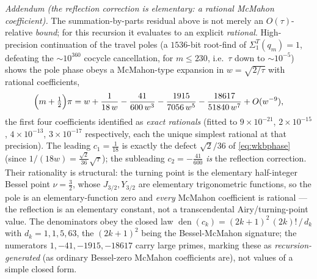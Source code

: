 \smallskip
\noindent\emph{Addendum \textup(the reflection correction is elementary: a rational McMahon coefficient\textup).}
The summation-by-parts residual above is not merely an $O(\tau)$-relative \emph{bound}; for this recursion it
evaluates to an explicit \emph{rational}. High-precision continuation of the travel poles (a $1536$-bit
root-find of $\Sigma_1^T(q_m)=1$, defeating the $\sim\!10^{360}$ cocycle cancellation, for $m\le230$, i.e.\
$\tau$ down to $\sim\!10^{-5}$) shows the pole phase obeys a McMahon-type expansion in $w=\sqrt{2/\tau}$ with
rational coefficients,
\begin{equation}\label{eq:mcmahon}
  \Bigl(m+\tfrac12\Bigr)\pi=w+\frac{1}{18\,w}-\frac{41}{600\,w^3}-\frac{1915}{7056\,w^5}
  -\frac{18617}{51840\,w^7}+O(w^{-9}),
\end{equation}
the first four coefficients identified as \emph{exact rationals} (fitted to $9\times10^{-21}$,
$2\times10^{-15}$, $4\times10^{-13}$, $3\times10^{-17}$ respectively, each the unique simplest rational at that
precision). The leading $c_1=\tfrac1{18}$ is exactly the defect $\sqrt2/36$ of \eqref{eq:wkbphase} (since
$1/(18w)=\tfrac{\sqrt2}{36}\sqrt\tau$); the subleading $c_2=-\tfrac{41}{600}$ \emph{is} the reflection
correction. Their rationality is structural: the turning point is the elementary half-integer Bessel point
$\nu=\tfrac32$, whose $J_{3/2},Y_{3/2}$ are elementary trigonometric functions, so the pole is an
elementary-function zero and \emph{every} McMahon coefficient is rational --- the reflection is an elementary
constant, not a transcendental Airy/turning-point value. The denominators obey the closed law
$\operatorname{den}(c_k)=(2k+1)^2\,(2k)!\,/\,d_k$ with $d_k=1,1,5,63$, the $(2k+1)^2$ being the Bessel-McMahon
signature; the numerators $1,-41,-1915,-18617$ carry large primes, marking these as \emph{recursion-generated}
(as ordinary Bessel-zero McMahon coefficients are), not values of a simple closed form.

